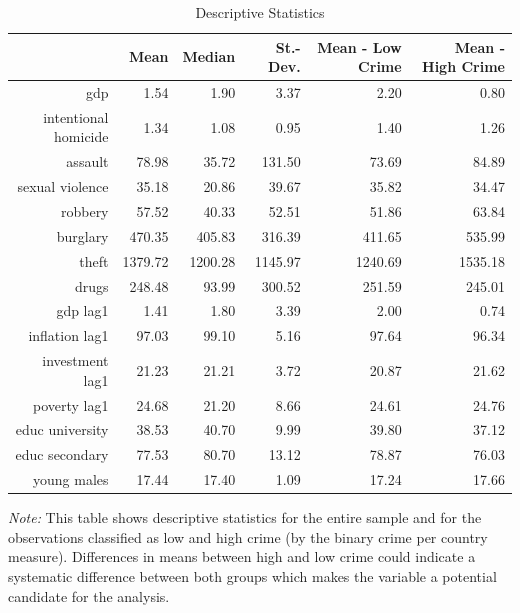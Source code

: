 \documentclass[a4paper,12pt]{article}
\begin{document}
\begin{singlespace}
		\begin{table}[!htbp]
			\centering
			\def\sym#1{\ifmmode^{#1}\else\(^{#1}\)\fi}
			\begin{threeparttable}
				\caption{Descriptive Statistics}\label{tab:descriptive_stats} 
\begin{tabular}{rrrrrr}
  \hline
 & Mean & Median & St.-Dev. & Mean - Low Crime & Mean - High Crime \\ 
  \hline
    gdp & 1.54 & 1.90 & 3.37 & 2.20 & 0.80 \\ 
    \hline
intentional homicide & 1.34 & 1.08 & 0.95 & 1.40 & 1.26 \\ 
  assault & 78.98 & 35.72 & 131.50 & 73.69 & 84.89 \\ 
  sexual violence & 35.18 & 20.86 & 39.67 & 35.82 & 34.47 \\ 
  robbery & 57.52 & 40.33 & 52.51 & 51.86 & 63.84 \\ 
  burglary & 470.35 & 405.83 & 316.39 & 411.65 & 535.99 \\ 
  theft & 1379.72 & 1200.28 & 1145.97 & 1240.69 & 1535.18 \\ 
  drugs & 248.48 & 93.99 & 300.52 & 251.59 & 245.01 \\ 
    \hline
  gdp lag1 & 1.41 & 1.80 & 3.39 & 2.00 & 0.74 \\ 
  inflation lag1 & 97.03 & 99.10 & 5.16 & 97.64 & 96.34 \\ 
  investment lag1 & 21.23 & 21.21 & 3.72 & 20.87 & 21.62 \\ 
  poverty lag1 & 24.68 & 21.20 & 8.66 & 24.61 & 24.76 \\ 
  educ university & 38.53 & 40.70 & 9.99 & 39.80 & 37.12 \\ 
  educ secondary & 77.53 & 80.70 & 13.12 & 78.87 & 76.03 \\ 
  young males & 17.44 & 17.40 & 1.09 & 17.24 & 17.66 \\ 
   \hline
\end{tabular}
\begin{footnotesize}
				\begin{tablenotes}
					\item \textit{Note:} This table shows descriptive statistics for the entire sample and for the observations classified as low and high crime (by the binary crime per country measure). Differences in means between high and low crime could indicate a systematic difference between both groups which makes the variable a potential candidate for the analysis.\\ 
				\end{tablenotes}
			\end{footnotesize}
			\end{threeparttable}
\end{table} 
\end{singlespace}
\end{document}
